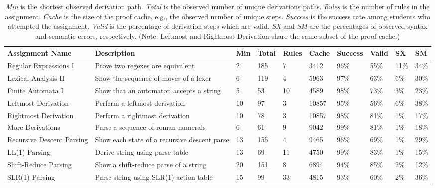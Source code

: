 \documentclass{sigchi}
\newcommand\tabhead[1]{\small\textbf{#1}}
\begin{document}
\begin{table}[!ht]\footnotesize
  \renewcommand{\arraystretch}{1.5}
  \begin{tabular}{|p{3.4cm}|p{4.4cm}|p{.7cm}|p{.7cm}|p{.7cm}|p{.7cm}|p{.8cm}|p{.7cm}||p{.7cm}|p{.7cm}|}
    \hline
    \tabhead{Assignment Name} & \tabhead{Description} & \tabhead{Min} & \tabhead{Total} & \tabhead{Rules} & \tabhead{Cache} & \tabhead{Success} & \tabhead{Valid} & \tabhead{SX} & \tabhead{SM} \\
    \hline
    Regular Expressions I & \scriptsize{Prove two regexes are equivalent} & 2 & 185 & 7 & 3412 & 96\% & 55\% & 11\% & 34\% \\
    \hline
    Lexical Analysis II & \scriptsize{Show the sequence of moves of a lexer} & 6 & 119 & 4 & 5963 & 97\% & 63\% & 6\% & 30\% \\
    \hline
    Finite Automata I & \scriptsize{Show that an automaton accepts a string} & 5 & 53 & 10 & 4589 & 98\% & 73\% & 3\% & 23\% \\
    \hline
    Leftmost Derivation & \scriptsize{Perform a leftmost derivation} & 10 & 97 & 3 & 10857 & 95\% & 56\% & 6\% & 38\% \\
    \hline
    Rightmost Derivation & \scriptsize{Perform a rightmost derivation} & 10 & 78 & 3 & 10857 & 98\% & 81\%  & 1\% & 17\% \\
    \hline
    More Derivations & \scriptsize{Parse a sequence of roman numerals} & 6 & 61 & 9 & 9042 & 99\% & 81\% & 1\% & 18\% \\
    \hline
    Recursive Descent Parsing & \scriptsize{Show each state of a recursive descent parse } & 13 & 155 & 4 & 9465 & 96\% & 69\% & 1\% & 29\% \\
    \hline
    LL(1) Parsing & \scriptsize{Derive string using parse table} & 13 & 69 & 11 & 4750 & 99\% & 83\% & 1\% & 15\% \\
    \hline
    Shift-Reduce Parsing & \scriptsize{Show a shift-reduce parse of a string} & 20 & 151 & 8 & 6894 & 94\% & 85\% & 2\% & 12\% \\
    \hline
    SLR(1) Parsing & \scriptsize{Parse string using SLR(1) action table} & 15 & 99 & 33 & 4815 & 93\% & 60\% & 2\% & 36\% \\
    \hline
  \end{tabular}
  \caption{\textit{Min} is the shortest observed derivation path. \textit{Total} is the observed number of unique derivations paths. \textit{Rules} is the number of rules in the assignment. \textit{Cache} is the size of the proof cache, e.g., the observed number of unique steps. \textit{Success} is the success rate among students who attempted the assignment. \textit{Valid} is the percentage of derivation steps which are valid. \textit{SX} and \textit{SM} are the percentages of observed syntax and semantic errors, respectively. (Note: Leftmost and Rightmost Derivation share the same subset of the proof cache.)}
  \label{tab:table1}
\end{table}
\end{document}
